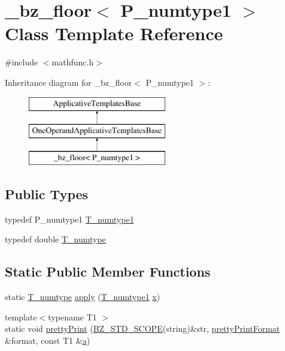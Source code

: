 \hypertarget{class__bz__floor}{}\section{\+\_\+bz\+\_\+floor$<$ P\+\_\+numtype1 $>$ Class Template Reference}
\label{class__bz__floor}


{\ttfamily \#include $<$mathfunc.\+h$>$}

Inheritance diagram for \+\_\+bz\+\_\+floor$<$ P\+\_\+numtype1 $>$\+:\begin{figure}[H]
\begin{center}
\leavevmode
\includegraphics[height=3.000000cm]{class__bz__floor}
\end{center}
\end{figure}
\subsection*{Public Types}
\begin{DoxyCompactItemize}
\item 
typedef P\+\_\+numtype1 \hyperlink{class__bz__floor_a75cfb63f9de5923f8e1c982dd1a8ec88}{T\+\_\+numtype1}
\item 
typedef double \hyperlink{class__bz__floor_a40151ad5bb6c2fd3d7936f189e7ccbfb}{T\+\_\+numtype}
\end{DoxyCompactItemize}
\subsection*{Static Public Member Functions}
\begin{DoxyCompactItemize}
\item 
static \hyperlink{class__bz__floor_a40151ad5bb6c2fd3d7936f189e7ccbfb}{T\+\_\+numtype} \hyperlink{class__bz__floor_abafd855b8e4563cb7cb7570351d7c276}{apply} (\hyperlink{class__bz__floor_a75cfb63f9de5923f8e1c982dd1a8ec88}{T\+\_\+numtype1} \hyperlink{vecnorm1_8cc_ac73eed9e41ec09d58f112f06c2d6cb63}{x})
\item 
{\footnotesize template$<$typename T1 $>$ }\\static void \hyperlink{class__bz__floor_a5eb31c7a9e7308cb458b94be5416409b}{pretty\+Print} (\hyperlink{numinquire_8h_a2b24ffc3b4ef9803956bc7715c6c7b83}{B\+Z\+\_\+\+S\+T\+D\+\_\+\+S\+C\+O\+P\+E}(string)\&str, \hyperlink{classprettyPrintFormat}{pretty\+Print\+Format} \&format, const T1 \&\hyperlink{gen__mat5files_8m_aae328bf20413f220e38aec4d95bfd6da}{a})
\end{DoxyCompactItemize}


